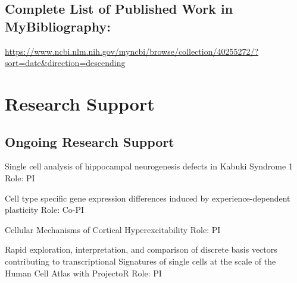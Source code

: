 \documentclass{nihbiosketch}
\begin{document}
\subsection*{Complete List of Published Work in MyBibliography:} 
\url{https://www.ncbi.nlm.nih.gov/myncbi/browse/collection/40255272/?sort=date&direction=descending}


\section{Research Support}

\subsection*{Ongoing Research Support}

{Single cell analysis of hippocampal neurogenesis defects in Kabuki Syndrome 1}
{Role: PI}


{Cell type specific gene expression differences induced by experience-dependent plasticity}
{Role: Co-PI}


{Cellular Mechanisms of Cortical Hyperexcitability}
{Role: PI}


{Rapid exploration, interpretation, and comparison of discrete basis vectors contributing to transcriptional Signatures of single cells at the scale of the Human Cell Atlas with ProjectoR}
{Role: PI}
\end{document}
